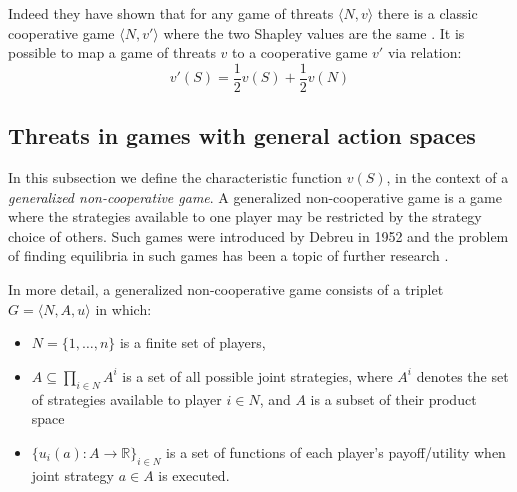 Indeed they have shown that for any game of threats $\langle N,v\rangle$ there is a classic cooperative game $\langle N,v'\rangle$ where the two Shapley values are the same \cite{KOHLBERG2018139}.
It is possible to map a game of threats $v$ to a cooperative game $v'$ via relation:
\begin{equation}\label{convert1}
v'(S)=\frac{1}{2}v(S)+\frac{1}{2}v(N)
\end{equation}


\subsection{Threats in games with general action spaces}\label{the_value_def3}

In this subsection we define the characteristic function $v(S)$, in the context of a \textit{generalized non-cooperative game}.
A generalized non-cooperative game is a game where the strategies available to one player may be restricted by the strategy choice of others.
Such games were introduced by Debreu in 1952 \cite{Debreu01101952} and the problem of finding equilibria in such games has been a topic of further research \cite{Facchinei2007,fischer2014}.

In more detail, a generalized non-cooperative game consists of a triplet $G = \langle N,A,u \rangle$ in which:
\begin{itemize}
\item	$N=\{1,\dots,n\}$ is a finite set of players,
\item	$A\subseteq \prod_{i\in N}A^i$ is a set of all possible joint strategies, where $A^i$ denotes the set of strategies available to player $i\in N$, and $A$ is a subset of their product space
\item	$\{u_i(a) : A\rightarrow \mathbb{R}\}_{i\in N}$ is a set of functions of each player's payoff/utility when joint strategy $a\in A$ is executed.
\end{itemize}

